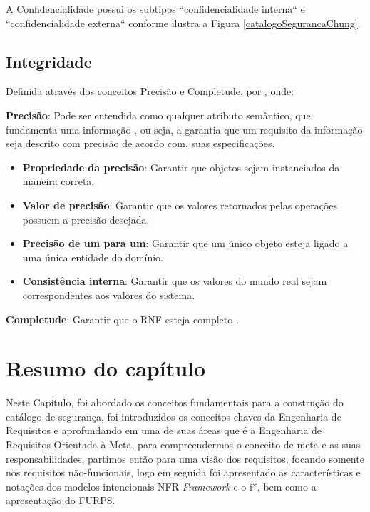 A Confidencialidade possui os subtipos ``confidencialidade interna`` e ``confidencialidade externa`` conforme ilustra a Figura \ref{catalogoSegurancaChung}.
 

\subsection{Integridade}
\label{subsec:integridade}
 
Definida através dos conceitos Precisão e Completude, por \cite{chung2012non}, onde: 

\textbf{Precisão}: Pode ser entendida como qualquer atributo semântico, que fundamenta uma informação \cite{chung2012non}, ou seja, a garantia que um requisito da informação seja descrito com precisão de acordo com, suas especificações. 

\begin{itemize}
	\item \textbf{Propriedade da precisão}: Garantir que objetos sejam instanciados da maneira correta. 
	
	\item \textbf{Valor de precisão}: Garantir que os valores retornados pelas operações possuem a precisão desejada.
	
	\item \textbf{Precisão de um para um}: Garantir que um único objeto esteja ligado a uma única entidade do domínio. 
	
	\item \textbf{Consistência interna}: Garantir que os valores do mundo real sejam correspondentes aos valores do sistema.
\end{itemize}

\textbf{Completude}: Garantir que o RNF esteja completo \cite{chung2012non}. 

\section{Resumo do capítulo}

Neste Capítulo, foi abordado os conceitos fundamentais para a construção do catálogo de segurança, foi introduzidos os conceitos chaves da Engenharia de Requisitos e aprofundando em uma de suas áreas que é a Engenharia de Requisitos Orientada à Meta, para compreendermos o conceito de meta e as suas responsabilidades, partimos então para uma visão dos requisitos, focando somente nos requisitos não-funcionais, logo em seguida foi apresentado as características e notações dos modelos intencionais NFR \textit{Framework} e o i*, bem como a apresentação do FURPS. 

